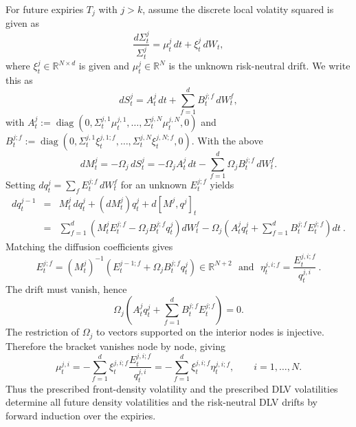 \documentclass[11pt]{article}
\theoremstyle{plain}
\theoremstyle{definition}
\theoremstyle{remark}
\begin{document}
{      For future expiries $T_j$ with $j>k$, assume the discrete local volatity squared is given as
      \[
        \frac{ d\Sigma_t^{j} }{ \Sigma_t^{j} }
          = \mu^j_t\,dt
          + \xi^j_t\,dW_t,
      \]
      where $\xi_t^j\in\mathbb R^{N\times d}$ is given and
      $\mu_t^j\in\mathbb R^N$ is the unknown risk-neutral drift. We write this as
      \[
        dS_t^j=A_t^j\,dt+\sum_{f=1}^dB_t^{j;f}\,dW_t^f,
      \]
      with
        $A_t^j
        :=\operatorname{diag}(0,\Sigma_t^{j,1}\mu_t^{j,1},\ldots,
            \Sigma_t^{j,N}\mu_t^{j,N},0)$ and $B_t^{j;f}
        :=\operatorname{diag}(0,\Sigma_t^{j,1}\xi_t^{j,1;f},\ldots,
            \Sigma_t^{j,N}\xi_t^{j,N;f},0).$
      With the above
      \[
        dM_t^j=-\Omega_j\,dS_t^j
        =-\Omega_jA_t^j\,dt
        -\sum_{f=1}^d\Omega_jB_t^{j;f}\,dW_t^f.
      \]
      Setting $dq_t^j=\sum_fE_t^{j;f}\,dW_t^f$ for an unknown $E_t^{j;f}$ yields
      \begin{eqnarray}
        dq_t^{j-1}
        & = & M_t^j\,dq_t^j+(dM_t^j)q_t^j+d[M^j,q^j]_t\\
        & = & \sum_{f=1}^d
          \left(M_t^jE_t^{j;f}-\Omega_jB_t^{j;f}q_t^j\right)dW_t^f
          -\Omega_j\left(A_t^jq_t^j
          +\sum_{f=1}^dB_t^{j;f}E_t^{j;f}\right)dt \ .
      \end{eqnarray}
      Matching the diffusion coefficients gives
      \begin{equation}
        \label{eq:vol_hb}
        E_t^{j;f}
        =(M_t^j)^{-1}
          \left(E_t^{j-1;f}+\Omega_jB_t^{j;f}q_t^j\right)
        \in\mathbb R^{N+2} \ \ \ \mbox{and} \ \ \ \eta_t^{j,i;f}=\frac{ E_t^{j,i;f} }{ q_t^{j,i} } \ .
      \end{equation}
      The drift must vanish, hence
      \[
        \Omega_j\left(A_t^jq_t^j
        +\sum_{f=1}^dB_t^{j;f}E_t^{j;f}\right)=0.
      \]
      The restriction of $\Omega_j$ to vectors supported on the interior nodes
      is injective. Therefore the bracket vanishes node by node, giving
      \begin{equation}
        \label{eq:drift_hb}
        \mu_t^{j,i}
        =-\sum_{f=1}^d\xi_t^{j,i;f}
          \frac{E_t^{j,i;f}}{q_t^{j,i}}
        =-\sum_{f=1}^d\xi_t^{j,i;f}\eta_t^{j,i;f},
        \qquad i=1,\ldots,N.
      \end{equation}
      Thus the prescribed front-density volatility and the prescribed DLV
      volatilities determine all future density volatilities and the
      risk-neutral DLV drifts by forward induction over the expiries.

}
\end{document}
